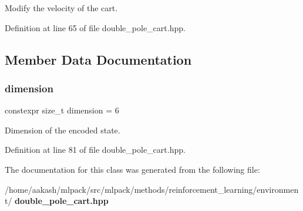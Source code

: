 Modify the velocity of the cart. 



Definition at line 65 of file double\+\_\+pole\+\_\+cart.\+hpp.



\subsection{Member Data Documentation}
\mbox{\label{classmlpack_1_1rl_1_1DoublePoleCart_1_1State_ae813298f34ef9d793885fc04b54dff99}} 
\subsubsection{dimension}
{\footnotesize\ttfamily constexpr size\+\_\+t dimension = 6\hspace{0.3cm}{\ttfamily [static]}}



Dimension of the encoded state. 



Definition at line 81 of file double\+\_\+pole\+\_\+cart.\+hpp.



The documentation for this class was generated from the following file\+:\begin{DoxyCompactItemize}
\item 
/home/aakash/mlpack/src/mlpack/methods/reinforcement\+\_\+learning/environment/\textbf{ double\+\_\+pole\+\_\+cart.\+hpp}\end{DoxyCompactItemize}

